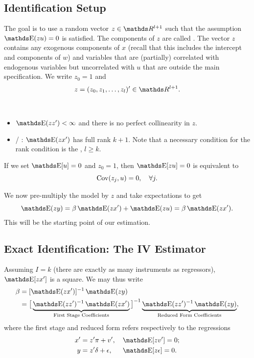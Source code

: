 \documentclass[letterpaper, 10pt]{article}
\begin{document}
\subsection{Identification Setup}
The goal is to use a random vector \(z \in \RR^{l + 1}\) such that the  assumption \(\E(zu) = 0\) is satisfied.
The components of \(z\) are called .
The vector \(z\) contains any exogenous components of \(x\) (recall that this includes the intercept and components of \(w\)) and variables that are (partially) correlated with endogenous variables but uncorrelated with \(u\) that are outside the main specification.
We write \(z_0 = 1\) and
\[
  z = (z_0, z_1, \dots, z_l)' \in \RR^{l + 1}.
\]

\begin{assumption}~
  \begin{itemize}
    \item \(\E(zz') < \infty\) and there is no perfect collinearity in \(z\).
    \item {} / : \(\E(zx')\) has full rank \(k + 1\).
      Note that a necessary condition for the rank condition is the , \(l \geq k\).
  \end{itemize}
\end{assumption}

\begin{remark}
  If we set \(\E[u] = 0\) and \(z_0 = 1\), then \(\E[zu] = 0\) is equivalent to
  \[
    \operatorname{Cov}(z_j, u) = 0, \quad \forall j.
  \]
\end{remark}

We now pre-multiply the model by \(z\) and take expectations to get
\[
  \E(zy)
  = \beta \E(zx') + \E(zu)
  = \beta \E(zx').
\]
This will be the starting point of our estimation.


\subsection{Exact Identification: The IV Estimator}
Assuming \(I = k\) (there are exactly as many instruments as regressors), \(\E[zx']\) is a square.
We may thus write
\begin{align*}
  \beta
  &= [\E(zx')]^{-1} \E(zy) \\
  &= \big[ \underbrace{\E(zz')^{-1} \E(zx')}_{\mathclap{\text{First Stage Coefficients}}} \big]^{-1}
  \underbrace{\E(zz')^{-1} \E(zy)}_{\mathclap{\text{Reduced Form Coefficients}}},
\end{align*}
where the first stage and reduced form refers respectively to the regressions
\begin{align*}
  x' &= z' \pi + v', &&
  \E[zv'] = 0; \\
  y &= z' \delta + \epsilon, &&
  \E[z\epsilon] = 0.
\end{align*}
\end{document}
